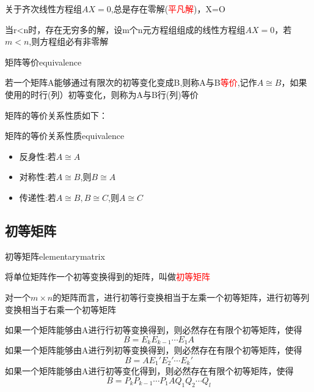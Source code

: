 
关于齐次线性方程组$AX=0$,总是存在零解(\textcolor{red}{平凡解})，X=O


当r<n时，存在无穷多的解，设m个n元方程组组成的线性方程组$AX=0$，若$m<n$,则方程组必有非零解
\begin{definition}{矩阵等价}{equivalence}

若一个矩阵A能够通过有限次的初等变化变成B,则称A与B\textcolor{red}{等价},记作$A\cong B$，如果使用的时行(列）初等变化，则称为A与B行(列)等价
\end{definition}


矩阵的等价关系性质如下：
\begin{theorem}{矩阵的等价关系性质}{equivalence}
    \begin{itemize}
        \item {反身性:若$A\cong A$}
        \item {对称性:若$A\cong B$,则$B\cong A$}
        \item {传递性:若$A\cong B,B\cong C$,则$A\cong C$}
    \end{itemize}
\end{theorem}

\subsection{初等矩阵}
\begin{definition}{初等矩阵}{elementarymatrix}

将单位矩阵作一个初等变换得到的矩阵，叫做\textcolor{red}{初等矩阵}
\end{definition}

对一个$m\times n$的矩阵而言，进行初等行变换相当于左乘一个初等矩阵，进行初等列变换相当于右乘一个初等矩阵

\begin{note}
    如果一个矩阵能够由A进行行初等变换得到，则必然存在有限个初等矩阵，使得
$$
B=E_kE_{k-1}\cdots E_1A
$$
如果一个矩阵能够由A进行列初等变换得到，则必然存在有限个初等矩阵，使得
$$
B=AE_1'E_2'\cdots E_k'
$$
如果一个矩阵能够由A进行初等变化得到，则必然存在有限个初等矩阵，使得
$$
B=P_kP_{k-1}\cdots P_1 A Q_1Q_2\cdots Q_l
$$
\end{note}
